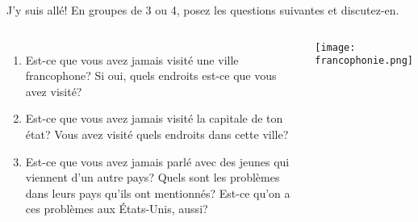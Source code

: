 \begin{frame}{J'y suis allé!}
  En groupes de 3 ou 4, posez les questions suivantes et discutez-en.
  \begin{columns}
      \small
      \begin{enumerate}
        \item Est-ce que vous avez jamais visité une ville francophone? Si oui, quels endroits est-ce que vous avez visité?
        \item Est-ce que vous avez jamais visité la capitale de ton état? Vous avez visité quels endroits dans cette ville?
        \item Est-ce que vous avez jamais parlé avec des jeunes qui viennent d'un autre pays? Quels sont les problèmes dans leurs pays qu'ils ont mentionnés? Est-ce qu'on a ces problèmes aux États-Unis, aussi?
      \end{enumerate}
      \begin{center}
        \texttt{[image: francophonie.png]}
      \end{center}
  \end{columns}
\end{frame}